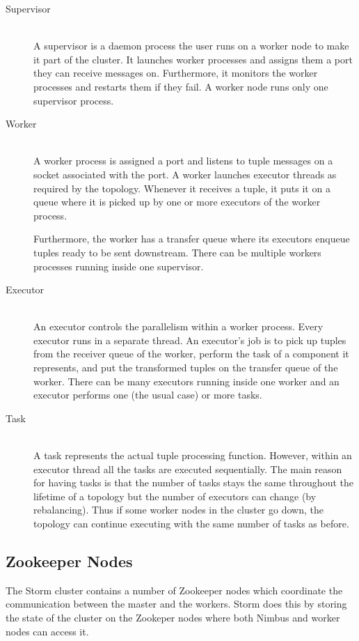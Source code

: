 \begin{description}
	\item[Supervisor] \hfill \\
	A supervisor is a daemon process the user runs on a worker node to make it part of the cluster. It launches worker processes and assigns them a port they can receive messages on. Furthermore, it monitors the worker processes and restarts them if they fail. A worker node runs only one supervisor process.
	\item[Worker] \hfill \\
	A worker process is assigned a port and listens to tuple messages on a socket associated with the port. A worker launches executor threads as required by the topology. Whenever it receives a tuple, it puts it on a queue where it is picked up by one or more executors of the worker process.
	
	Furthermore, the worker has a transfer queue where its executors enqueue tuples ready to be sent downstream. There can be multiple workers processes running inside one supervisor.
	\item[Executor] \hfill \\
	An executor controls the parallelism within a worker process. Every executor runs in a separate thread. An executor's job is to pick up tuples from the receiver queue of the worker, perform the task of a component it represents, and put the transformed tuples on the transfer queue of the worker. There can be many executors running inside one worker and an executor performs one (the usual case) or more tasks.
	\item[Task] \hfill \\
	A task represents the actual tuple processing function. However, within an executor thread all the tasks are executed sequentially. The main reason for having tasks is that the number of tasks stays the same throughout the lifetime of a topology but the number of executors can change (by rebalancing). Thus if some worker nodes in the cluster go down, the topology can continue executing with the same number of tasks as before.
\end{description}

\subsection{Zookeeper Nodes}

The Storm cluster contains a number of Zookeeper nodes which coordinate the communication between the master and the workers. Storm does this by storing the state of the cluster on the Zookeper nodes where both Nimbus and worker nodes can access it.

